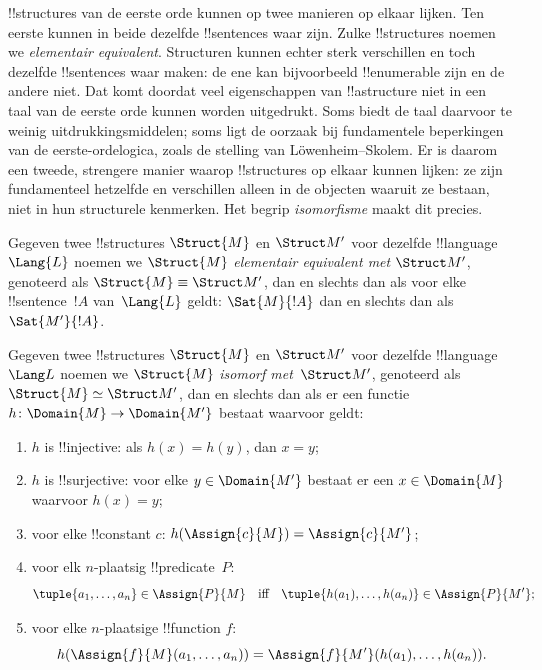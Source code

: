 \documentclass[../../../include/open-logic-section]{subfiles}
\begin{document}

!!{structure}s van de eerste orde kunnen op twee manieren op elkaar
lijken. Ten eerste kunnen in beide dezelfde !!{sentence}s waar zijn.
Zulke !!{structure}s noemen we \emph{elementair equivalent}. Structuren
kunnen echter sterk verschillen en toch dezelfde !!{sentence}s waar
maken: de ene kan bijvoorbeeld !!{enumerable} zijn en de andere niet.
Dat komt doordat veel eigenschappen van !!a{structure} niet in een taal
van de eerste orde kunnen worden uitgedrukt. Soms biedt de taal daarvoor
te weinig uitdrukkingsmiddelen; soms ligt de oorzaak bij fundamentele
beperkingen van de eerste-ordelogica, zoals de stelling van
L\"owenheim--Skolem. Er is daarom een tweede, strengere manier waarop
!!{structure}s op elkaar kunnen lijken: ze zijn fundamenteel hetzelfde
en verschillen alleen in de objecten waaruit ze bestaan, niet in hun
structurele kenmerken. Het begrip \emph{isomorfisme} maakt dit precies.

\begin{defn}
Gegeven twee !!{structure}s $\Struct{M}$ en $\Struct M'$ voor dezelfde
!!{language}~$\Lang{L}$ noemen we $\Struct{M}$ \emph{elementair
  equivalent met} $\Struct M'$, genoteerd als $\Struct{M} \equiv \Struct M'$,
dan en slechts dan als voor elke !!{sentence}~$!A$ van~$\Lang{L}$ geldt:
$\Sat{M}{!A}$ dan en slechts dan als $\Sat{M'}{!A}$.
\end{defn}

\begin{defn}
 Gegeven twee !!{structure}s $\Struct{M}$ en
$\Struct M'$ voor dezelfde !!{language}~$\Lang L$ noemen we
$\Struct{M}$ \emph{isomorf met}~$\Struct M'$, genoteerd als $\Struct{M}
\simeq \Struct M'$, dan en slechts dan als er een functie $h \colon
\Domain{M} \to \Domain{M'}$ bestaat waarvoor geldt:
\begin{enumerate}
\item $h$ is !!{injective}: als $h(x) =
  h(y)$, dan $x = y$; 
\item $h$ is !!{surjective}: voor elke $y \in \Domain{M'}$ bestaat
  er een $x \in \Domain{M}$ waarvoor $h(x) = y$;
\item {}voor elke !!{constant} $c$:
  $h(\Assign{c}{M}) = \Assign{c}{M'}$;
\item {}voor elk $n$-plaatsig !!{predicate}~$P$:
  \[
  \tuple{a_1, \dots, a_n}\in \Assign{P}{M} \quad\text{iff}\quad
  \tuple{h(a_1), \dots, h(a_n)} \in \Assign{P}{M'};
  \]
\item {}voor elke $n$-plaatsige !!{function} $f$:
  \[
  h(\Assign{f}{M}(a_1, \dots, a_n)) =
  \Assign{f}{M'}(h(a_1), \dots, h(a_n)).
  \]
\end{enumerate}
\end{defn}
\end{document}
